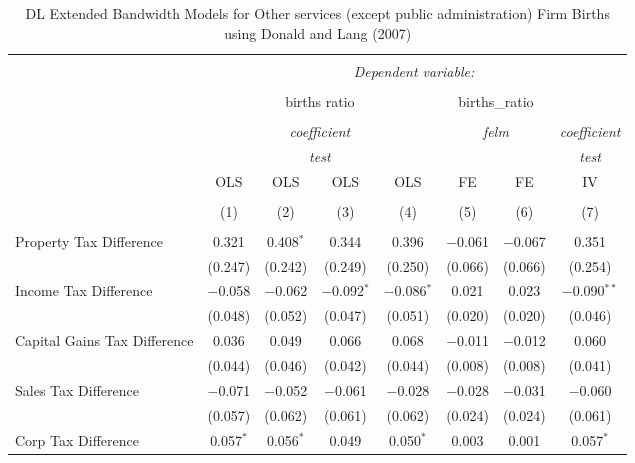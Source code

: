 
\begin{table}[!htbp] \centering 
  \caption{DL Extended Bandwidth Models for  Other services (except public administration) Firm Births using Donald and Lang (2007)} 
  \label{} 
\begin{tabular}{@{\extracolsep{5pt}}lccccccc} 
\\[-1.8ex]\hline 
\hline \\[-1.8ex] 
 & \multicolumn{7}{c}{\textit{Dependent variable:}} \\ 
\cline{2-8} 
\\[-1.8ex] & \multicolumn{4}{c}{births ratio} & \multicolumn{2}{c}{births\_ratio} &   \\ 
\\[-1.8ex] & \multicolumn{4}{c}{\textit{coefficient}} & \multicolumn{2}{c}{\textit{felm}} & \textit{coefficient} \\ 
 & \multicolumn{4}{c}{\textit{test}} & \multicolumn{2}{c}{\textit{}} & \textit{test} \\ 
 & OLS & OLS & OLS & OLS & FE & FE & IV \\ 
\\[-1.8ex] & (1) & (2) & (3) & (4) & (5) & (6) & (7)\\ 
\hline \\[-1.8ex] 
 Property Tax Difference & 0.321 & 0.408$^{*}$ & 0.344 & 0.396 & $-$0.061 & $-$0.067 & 0.351 \\ 
  & (0.247) & (0.242) & (0.249) & (0.250) & (0.066) & (0.066) & (0.254) \\ 
  Income Tax Difference & $-$0.058 & $-$0.062 & $-$0.092$^{*}$ & $-$0.086$^{*}$ & 0.021 & 0.023 & $-$0.090$^{**}$ \\ 
  & (0.048) & (0.052) & (0.047) & (0.051) & (0.020) & (0.020) & (0.046) \\ 
  Capital Gains Tax Difference & 0.036 & 0.049 & 0.066 & 0.068 & $-$0.011 & $-$0.012 & 0.060 \\ 
  & (0.044) & (0.046) & (0.042) & (0.044) & (0.008) & (0.008) & (0.041) \\ 
  Sales Tax Difference & $-$0.071 & $-$0.052 & $-$0.061 & $-$0.028 & $-$0.028 & $-$0.031 & $-$0.060 \\ 
  & (0.057) & (0.062) & (0.061) & (0.062) & (0.024) & (0.024) & (0.061) \\ 
  Corp Tax Difference & 0.057$^{*}$ & 0.056$^{*}$ & 0.049 & 0.050$^{*}$ & 0.003 & 0.001 & 0.057$^{*}$ \\ 

\end{tabular}
\end{table}
